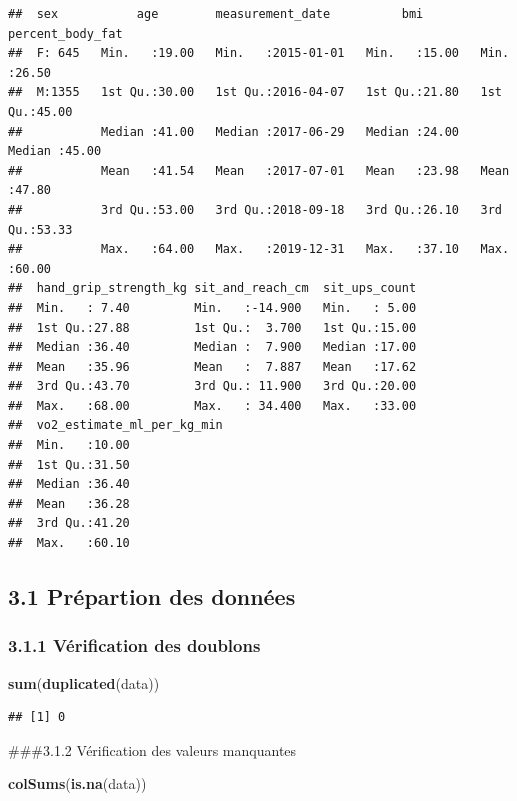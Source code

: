 \documentclass[
]{article}
\newenvironment{Shaded}{\begin{snugshade}}{\end{snugshade}}
\newcommand{\FunctionTok}[1]{\textcolor[rgb]{0.13,0.29,0.53}{\textbf{#1}}}
\newcommand{\NormalTok}[1]{#1}
\begin{document}
\begin{verbatim}
##  sex           age        measurement_date          bmi        percent_body_fat
##  F: 645   Min.   :19.00   Min.   :2015-01-01   Min.   :15.00   Min.   :26.50   
##  M:1355   1st Qu.:30.00   1st Qu.:2016-04-07   1st Qu.:21.80   1st Qu.:45.00   
##           Median :41.00   Median :2017-06-29   Median :24.00   Median :45.00   
##           Mean   :41.54   Mean   :2017-07-01   Mean   :23.98   Mean   :47.80   
##           3rd Qu.:53.00   3rd Qu.:2018-09-18   3rd Qu.:26.10   3rd Qu.:53.33   
##           Max.   :64.00   Max.   :2019-12-31   Max.   :37.10   Max.   :60.00   
##  hand_grip_strength_kg sit_and_reach_cm  sit_ups_count  
##  Min.   : 7.40         Min.   :-14.900   Min.   : 5.00  
##  1st Qu.:27.88         1st Qu.:  3.700   1st Qu.:15.00  
##  Median :36.40         Median :  7.900   Median :17.00  
##  Mean   :35.96         Mean   :  7.887   Mean   :17.62  
##  3rd Qu.:43.70         3rd Qu.: 11.900   3rd Qu.:20.00  
##  Max.   :68.00         Max.   : 34.400   Max.   :33.00  
##  vo2_estimate_ml_per_kg_min
##  Min.   :10.00             
##  1st Qu.:31.50             
##  Median :36.40             
##  Mean   :36.28             
##  3rd Qu.:41.20             
##  Max.   :60.10
\end{verbatim}

\subsection{3.1 Prépartion des
données}\label{pruxe9partion-des-donnuxe9es}

\subsubsection{3.1.1 Vérification des
doublons}\label{vuxe9rification-des-doublons}

\begin{Shaded}
\begin{Highlighting}[]
\FunctionTok{sum}\NormalTok{(}\FunctionTok{duplicated}\NormalTok{(data))}
\end{Highlighting}
\end{Shaded}

\begin{verbatim}
## [1] 0
\end{verbatim}

\#\#\#3.1.2 Vérification des valeurs manquantes

\begin{Shaded}
\begin{Highlighting}[]
\FunctionTok{colSums}\NormalTok{(}\FunctionTok{is.na}\NormalTok{(data))}
\end{Highlighting}
\end{Shaded}
\end{document}
